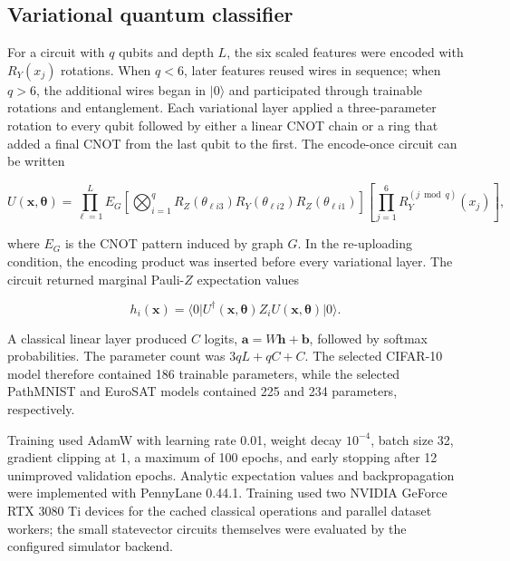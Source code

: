 \documentclass[pdflatex,sn-mathphys-num]{sn-jnl}
\begin{document}
\subsection{Variational quantum classifier}

For a circuit with $q$ qubits and depth $L$, the six scaled features were encoded with $R_Y(x_j)$ rotations. When $q<6$, later features reused wires in sequence; when $q>6$, the additional wires began in $\lvert0\rangle$ and participated through trainable rotations and entanglement. Each variational layer applied a three-parameter rotation to every qubit followed by either a linear CNOT chain or a ring that added a final CNOT from the last qubit to the first. The encode-once circuit can be written

\begin{equation}
U(\boldsymbol{x},\boldsymbol{\theta})=
\prod_{\ell=1}^{L} E_G
\left[\bigotimes_{i=1}^{q}R_Z(\theta_{\ell i3})R_Y(\theta_{\ell i2})R_Z(\theta_{\ell i1})\right]
\left[\prod_{j=1}^{6}R_Y^{(j\bmod q)}(x_j)\right],
\label{eq:circuit}
\end{equation}

where $E_G$ is the CNOT pattern induced by graph $G$. In the re-uploading condition, the encoding product was inserted before every variational layer. The circuit returned marginal Pauli-$Z$ expectation values

\begin{equation}
h_i(\boldsymbol{x})=\langle 0\rvert U^{\dagger}(\boldsymbol{x},\boldsymbol{\theta})Z_iU(\boldsymbol{x},\boldsymbol{\theta})\lvert0\rangle.
\label{eq:expectation}
\end{equation}

A classical linear layer produced $C$ logits, $\boldsymbol{a}=W\boldsymbol{h}+\boldsymbol{b}$, followed by softmax probabilities. The parameter count was $3qL+qC+C$. The selected CIFAR-10 model therefore contained 186 trainable parameters, while the selected PathMNIST and EuroSAT models contained 225 and 234 parameters, respectively.

Training used AdamW with learning rate 0.01, weight decay $10^{-4}$, batch size 32, gradient clipping at 1, a maximum of 100 epochs, and early stopping after 12 unimproved validation epochs. Analytic expectation values and backpropagation were implemented with PennyLane 0.44.1. Training used two NVIDIA GeForce RTX 3080 Ti devices for the cached classical operations and parallel dataset workers; the small statevector circuits themselves were evaluated by the configured simulator backend.
\end{document}
